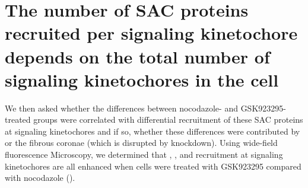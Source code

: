\section{The number of SAC proteins recruited per signaling kinetochore depends on the total number of signaling kinetochores in the cell}

We then asked whether the differences between nocodazole- and GSK923295-treated groups were correlated with differential recruitment of these SAC proteins at signaling kinetochores and if so, whether these differences were contributed by  or the fibrous coronae (which is disrupted by  knockdown). Using wide-field fluorescence Microscopy, we determined that , , and  recruitment at signaling kinetochores are all enhanced when cells were treated with GSK923295 compared with nocodazole ().

